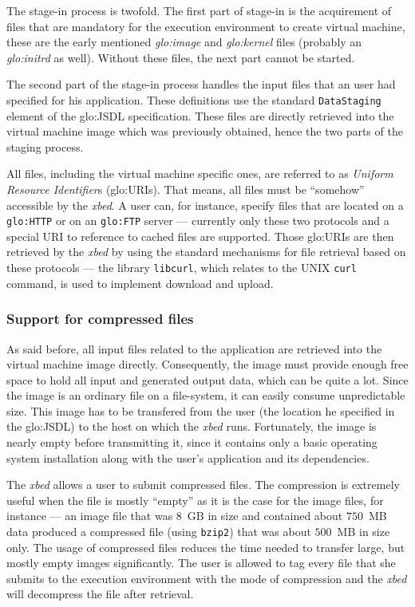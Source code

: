 The  stage-in process  is  twofold.  The  first  part of  stage-in is  the
acquirement of files  that are mandatory for the  execution environment to
create    virtual    machine,    these    are    the    early    mentioned
\emph{\gls{glo:image}}  and  \emph{\gls{glo:kernel}}  files  (probably  an
\emph{\gls{glo:initrd}}  as well).   Without  these files,  the next  part
cannot be started.

The second  part of the stage-in  process handles the input  files that an
user had specified for his application. These definitions use the standard
\texttt{DataStaging}  element of  the \gls{glo:JSDL}  specification. These
files  are directly  retrieved into  the virtual  machine image  which was
previously obtained, hence the two parts of the staging process.

All files, including the virtual machine specific ones, are referred to as
\emph{Uniform  Resource  Identifier}s  (\gls{glo:URI}s). That  means,  all
files must be ``somehow'' accessible by the \emph{xbed}.  A user can, for
instance, specify files that  are located on a \texttt{\gls{glo:HTTP}} or
on an \texttt{\gls{glo:FTP}} server --- currently only these two protocols
and  a special  URI to  reference to  cached files  are  supported.  Those
\gls{glo:URI}s are then retrieved by the \emph{xbed} by using the standard
mechanisms for  file retrieval  based on these  protocols ---  the library
\texttt{libcurl}, which relates to the UNIX \texttt{curl} command, is used
to implement download and upload.

\subsubsection{Support for compressed files}

As said before,  all input files related to  the application are retrieved
into  the virtual  machine image  directly. Consequently,  the  image must
provide enough  free space  to hold all  input and generated  output data,
which  can be  quite a  lot. Since  the  image is  an ordinary  file on  a
file-system, it can  easily consume unpredictable size. This  image has to
be  transfered  from  the user  (\ie  the  location  he specified  in  the
\gls{glo:JSDL}) to  the host on  which the \emph{xbed}  runs. Fortunately,
the image is nearly empty before transmitting it, since it contains only a
basic operating system installation  along with the user's application and
its dependencies.

The \emph{xbed} allows a user to submit compressed files. The compression
is extremely  useful when the file is  mostly ``empty'' as it  is the case
for the  image files, for  instance --- an  image file that was  $8$~GB in
size and contained  about $750$~MB data produced a  compressed file (using
\texttt{bzip2})  that was  about  $500$~MB  in size  only.   The usage  of
compressed files  reduces the  time needed to  transfer large,  but mostly
empty images significantly. The user is allowed to tag every file that she
submits to the execution environment  with the mode of compression and the
\emph{xbed} will decompress the file after retrieval.

